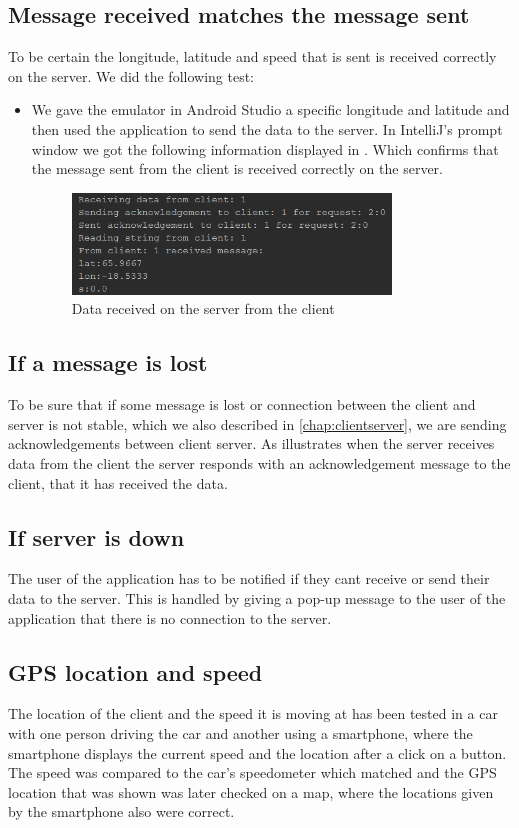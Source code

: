 \subsection{Message received matches the message sent}
To be certain the longitude, latitude and speed that is sent is received correctly on the server. We did the following test:
\begin{itemize}
	\item We gave the emulator in Android Studio a specific longitude and latitude and then used the application to send the data to the server. In IntelliJ's prompt window we got the following information displayed in . Which confirms that the message sent from the client is received correctly on the server.
	\begin{figure}[h!]
  \centering
    \includegraphics[width=0.8\textwidth]{figures/datasentfromclienttoserver.png}
    \caption{Data received on the server from the client}
    \label{fig:datasentfromclienttoserver}
\end{figure}
\end{itemize}

\subsection{If a message is lost}
To be sure that if some message is lost or connection between the client and server is not stable, which we also described in \autoref{chap:clientserver}, we are sending acknowledgements between client server. As   illustrates when the server receives data from the client the server responds with an acknowledgement message to the client, that it has received the data.

\subsection{If server is down}
The user of the application has to be notified if they cant receive or send their data to the server. This is handled by giving a pop-up message to the user of the application that there is no connection to the server.

\subsection{GPS location and speed}
The location of the client and the speed it is moving at has been tested in a car with one person driving the car and another using a smartphone, where the smartphone displays the current speed and the location after a click on a button. The speed was compared to the car's speedometer which matched and the GPS location that was shown was later checked on a map, where the locations given by the smartphone also were correct.